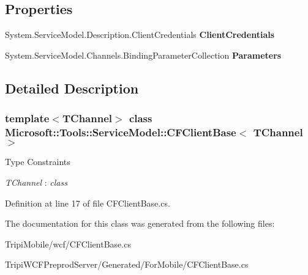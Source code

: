 \subsection*{Properties}
\begin{DoxyCompactItemize}
\item 
\hypertarget{class_microsoft_1_1_tools_1_1_service_model_1_1_c_f_client_base_3_01_t_channel_01_4_abfb105679a39273c455d4fb06761785a}{
System.ServiceModel.Description.ClientCredentials {\bfseries ClientCredentials}}
\label{class_microsoft_1_1_tools_1_1_service_model_1_1_c_f_client_base_3_01_t_channel_01_4_abfb105679a39273c455d4fb06761785a}

\item 
\hypertarget{class_microsoft_1_1_tools_1_1_service_model_1_1_c_f_client_base_3_01_t_channel_01_4_a92f0d5f2a449ad69e6ef58d480028550}{
System.ServiceModel.Channels.BindingParameterCollection {\bfseries Parameters}}
\label{class_microsoft_1_1_tools_1_1_service_model_1_1_c_f_client_base_3_01_t_channel_01_4_a92f0d5f2a449ad69e6ef58d480028550}

\end{DoxyCompactItemize}


\subsection{Detailed Description}
\subsubsection*{template$<$TChannel$>$ class Microsoft::Tools::ServiceModel::CFClientBase$<$ TChannel $>$}

\begin{Desc}
\item[Type Constraints]\begin{description}
\item[{\em TChannel} : {\em class}]\end{description}
\end{Desc}


Definition at line 17 of file CFClientBase.cs.

The documentation for this class was generated from the following files:\begin{DoxyCompactItemize}
\item 
TripiMobile/wcf/CFClientBase.cs\item 
TripiWCFPreprodServer/Generated/ForMobile/CFClientBase.cs\end{DoxyCompactItemize}
